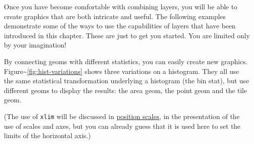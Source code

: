 Once you have become comfortable with combining layers, you will be able
to create graphics that are both intricate and useful. The following
examples demonstrate some of the ways to use the capabilities of layers
that have been introduced in this chapter. These are just to get you
started. You are limited only by your imagination!


By connecting geoms with different statistics, you can easily create new
graphics. Figure\textasciitilde{}\ref{fig:hist-variations} shows three
variations on a histogram. They all use the same statistical
transformation underlying a histogram (the bin stat), but use different
geoms to display the results: the area geom, the point geom and the tile
geom. 

\begin{Shaded}
\begin{Highlighting}[]
\StringTok{ }\StringTok{ }\NormalTok{(}\NormalTok{, }\NormalTok{)}
\StringTok{ }\NormalTok{(}\NormalTok{(}  \NormalTok{, } \NormalTok{)}
\StringTok{ }\NormalTok{(}
  \NormalTok{(}  \NormalTok{, }
   \NormalTok{, }
\NormalTok{)}
\StringTok{ }\NormalTok{(}
  \NormalTok{(} \NormalTok{, }  \NormalTok{, }
   \NormalTok{, }
\NormalTok{)}
\end{Highlighting}
\end{Shaded}

(The use of \texttt{xlim} will be discussed in
\hyperref[sub:scale-position]{position scales}, in the presentation of
the use of scales and axes, but you can already guess that it is used
here to set the limits of the horizontal axis.)

